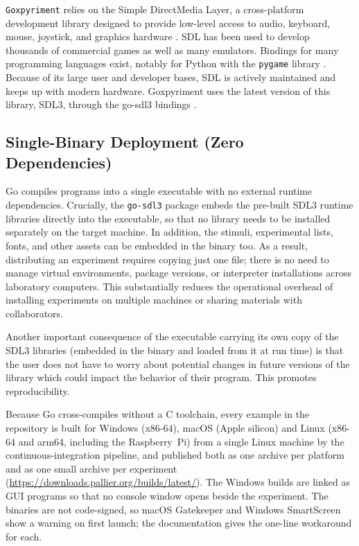 \documentclass[doc,a4paper,floatsintext]{apa7}
\begin{document}
\texttt{Goxpyriment} relies on the Simple DirectMedia Layer, a
cross-platform development library designed to provide low-level
access to audio, keyboard, mouse, joystick, and graphics hardware
\parencite{sdl3}.  SDL has been used to develop thousands of
commercial games as well as many emulators. Bindings for many
programming languages exist, notably for Python with the \verb|pygame|
library \parencite{pygame}. Because of its large user and developer
bases, SDL is actively maintained and keeps up with modern hardware.
Goxpyriment uses the latest version of this library, SDL3, through the
go-sdl3 bindings \parencite{gosdl3}.


\subsection{Single-Binary Deployment (Zero Dependencies)}\label{single-binary-deployment}

Go compiles programs into a single executable with no external runtime
dependencies. Crucially, the \texttt{go-sdl3}
package embeds the pre-built SDL3 runtime libraries \parencite{sdl3}
directly into the executable, so that no library needs to be installed
separately on the target machine.  In addition, the stimuli,
experimental lists, fonts, and other assets can be embedded in the
binary too. As a result, distributing an experiment requires copying
just one file; there is no need to manage virtual environments,
package versions, or interpreter installations across laboratory
computers. This substantially reduces the operational overhead of
installing experiments on multiple machines or sharing materials with
collaborators.

Another important consequence of the executable carrying its own copy of
the SDL3 libraries (embedded in the binary and loaded from it at run time) is that the user does not have to worry about
potential changes in future versions of the library which could impact
the behavior of their program. This promotes reproducibility.

Because Go cross-compiles without a C toolchain, every example in the
repository is built for Windows (x86-64), macOS (Apple silicon) and
Linux (x86-64 and arm64, including the Raspberry~Pi) from a single
Linux machine by the continuous-integration pipeline, and published
both as one archive per platform and as one small archive per
experiment (\url{https://downloads.pallier.org/builds/latest/}). The
Windows builds are linked as GUI programs so that no console window
opens beside the experiment. The binaries are not code-signed, so
macOS Gatekeeper and Windows SmartScreen show a warning on first
launch; the documentation gives the one-line workaround for each.
\end{document}
